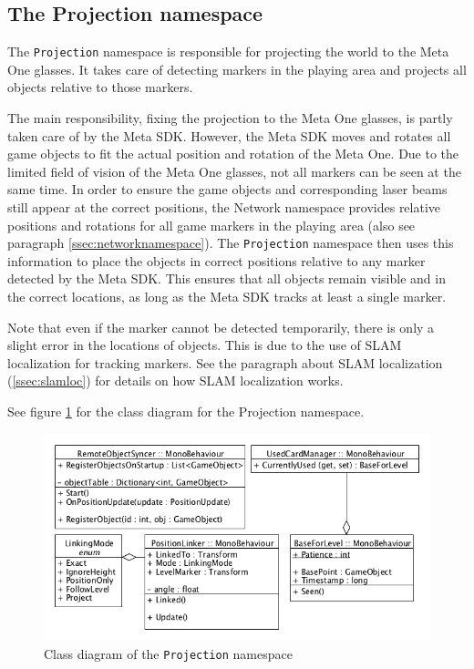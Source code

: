 		\subsection{The Projection namespace} \label{ssec:projectionnamespace}
			The \texttt{Projection} namespace is responsible for projecting the 
			world to the Meta One glasses. It takes care of detecting 
			markers in the playing area and projects all objects relative
			to those markers. 
			
			The main responsibility, fixing the projection to the Meta One 
			glasses, is partly taken care of by the Meta SDK. However, the 
			Meta SDK moves and rotates all game objects to fit the actual 
			position and rotation of the Meta One. Due to the limited field 
			of vision of the Meta One glasses, not all markers can be seen at 
			the same time. In order to ensure the game objects and 
			corresponding laser beams still appear at the correct positions,
			the Network namespace provides relative positions and rotations for 
			all game markers in the playing area (also see paragraph 
			\ref{ssec:networknamespace}). The \texttt{Projection} namespace then uses
			this information to place the objects in correct positions relative
			to any marker detected by the Meta SDK. This ensures that all objects
			remain visible and in the correct locations, as long as the Meta SDK 
			tracks at least a single marker.
			
			Note that even if the marker cannot be detected temporarily, there 
			is only a slight error in the locations of objects. This is due to 
			the use of SLAM localization for tracking markers. See the paragraph
			about SLAM localization (\ref{ssec:slamloc}) for details on how SLAM 
			localization works.
			
			See figure \ref{fig:classdiagramprojection} for the class diagram for 
			the Projection namespace.
			
			\begin{figure}[ht]
				\includegraphics[width=\textwidth]{ClassDiagramProjection}
				\caption{Class diagram of the \texttt{Projection} namespace}
				\label{fig:classdiagramprojection}
			\end{figure}
			
